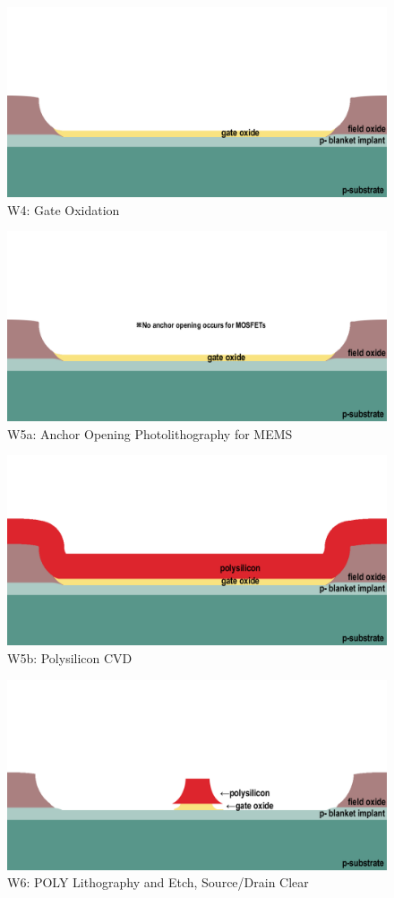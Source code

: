\documentclass{article}
\begin{document}
\begin{figure}[H]
\centering
\includegraphics[width=350pt]{CrossSections/MOSFETlabprofiles/MOSFETw4.png}
\caption{W4: Gate Oxidation}
\end{figure}
\begin{figure}[H]
\centering
\includegraphics[width=350pt]{CrossSections/MOSFETlabprofiles/MOSFETw5anote.png}
\caption{W5a: Anchor Opening Photolithography for MEMS}
\end{figure}
\begin{figure}[H]
\centering
\includegraphics[width=350pt]{CrossSections/MOSFETlabprofiles/MOSFETw5b.png}
\caption{W5b: Polysilicon CVD}
\end{figure}
\begin{figure}[H]
\centering
\includegraphics[width=350pt]{CrossSections/MOSFETlabprofiles/MOSFETw6.png}
\caption{W6: POLY Lithography and Etch, Source/Drain Clear}
\end{figure}
\end{document}
